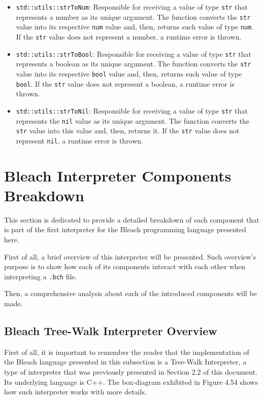 \begin{itemize}
\begin{itemize}
            \item \texttt{std::utils::strToNum}: Responsible for receiving a value of type \texttt{str} that represents a number as its unique argument. The function converts the \texttt{str} value into its respective \texttt{num} value and, then, returns such value of type \texttt{num}. If the \texttt{str} value does not represent a number, a runtime error is thrown.

            \item \texttt{std::utils::strToBool}: Responsible for receiving a value of type \texttt{str} that represents a boolean as its unique argument. The function converts the \texttt{str} value into its respective \texttt{bool} value and, then, returns such value of type \texttt{bool}. If the \texttt{str} value does not represent a boolean, a runtime error is thrown.

            \item \texttt{std::utils::strToNil}: Responsible for receiving a value of type \texttt{str} that represents the \texttt{nil} value as its unique argument. The function converts the \texttt{str} value into this value and, then, returns it. If the \texttt{str} value does not represent \texttt{nil}, a runtime error is thrown.
        \end{itemize}
\end{itemize}

\section{Bleach Interpreter Components Breakdown}
This section is dedicated to provide a detailed breakdown of each component that is part of the first interpreter for the Bleach programming language presented here.

First of all, a brief overview of this interpreter will be presented. Such overview's purpose is to show how each of its components interact with each other when interpreting a \texttt{.bch} file.

Then, a comprehensive analysis about each of the introduced components will be made.

\subsection{Bleach Tree-Walk Interpreter Overview}
First of all, it is important to remember the reader that the implementation of the Bleach language presented in this subsection is a Tree-Walk Interpreter, a type of interpreter that was previously presented in Section 2.2 of this document. Its underlying language is C++. The box-diagram exhibited in Figure 4.54 shows how such interpreter works with more details.

